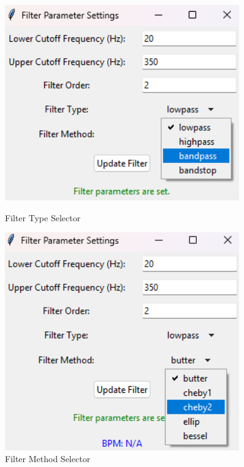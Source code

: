 \begin{figure}[h]
    \centering
    \begin{minipage}{0.5\textwidth}
        \includegraphics[width=0.9\textwidth , height=0.2\textheight]{assets/filter-type-selector.png}
        \caption{Filter Type Selector}
        \label{fig:gui-filter-type-selector}
    \end{minipage}%
    \begin{minipage}{0.5\textwidth}
        \includegraphics[width=0.9\textwidth , height=0.2\textheight]{assets/filter-method-selector.png}
        \caption{Filter Method Selector}
        \label{fig:gui-filter-method-selector}
    \end{minipage}
\end{figure}
